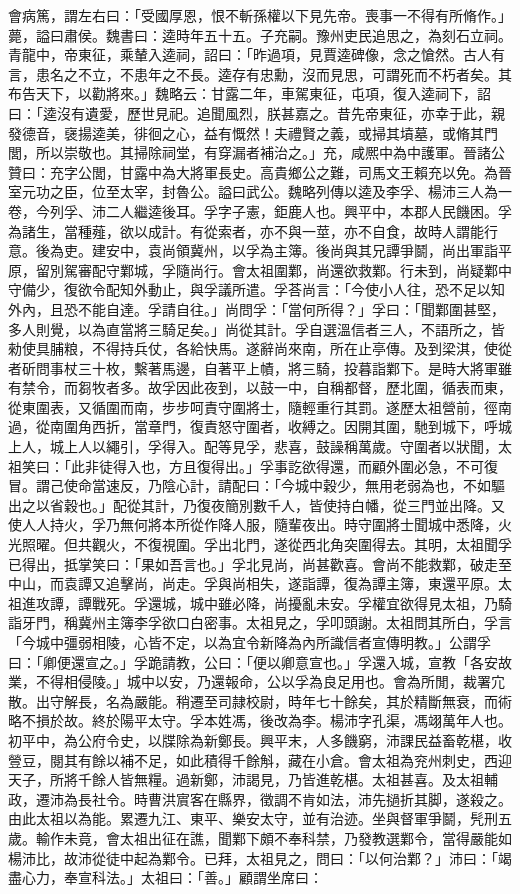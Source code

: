 \begin{pinyinscope}
會病篤，謂左右曰：「受國厚恩，恨不斬孫權以下見先帝。喪事一不得有所脩作。」薨，謚曰肅侯。魏書曰：逵時年五十五。子充嗣。豫州吏民追思之，為刻石立祠。青龍中，帝東征，乘輦入逵祠，詔曰：「昨過項，見賈逵碑像，念之愴然。古人有言，患名之不立，不患年之不長。逵存有忠勳，沒而見思，可謂死而不朽者矣。其布告天下，以勸將來。」魏略云：甘露二年，車駕東征，屯項，復入逵祠下，詔曰：「逵沒有遺愛，歷世見祀。追聞風烈，朕甚嘉之。昔先帝東征，亦幸于此，親發德音，襃揚逵美，徘徊之心，益有慨然！夫禮賢之義，或掃其墳墓，或脩其門閭，所以崇敬也。其掃除祠堂，有穿漏者補治之。」充，咸熈中為中護軍。晉諸公贊曰：充字公閭，甘露中為大將軍長史。高貴鄉公之難，司馬文王賴充以免。為晉室元功之臣，位至太宰，封魯公。謚曰武公。魏略列傳以逵及李孚、楊沛三人為一卷，今列孚、沛二人繼逵後耳。孚字子憲，鉅鹿人也。興平中，本郡人民饑困。孚為諸生，當種薤，欲以成計。有從索者，亦不與一莖，亦不自食，故時人謂能行意。後為吏。建安中，袁尚領冀州，以孚為主簿。後尚與其兄譚爭鬬，尚出軍詣平原，留別駕審配守鄴城，孚隨尚行。會太祖圍鄴，尚還欲救鄴。行未到，尚疑鄴中守備少，復欲令配知外動止，與孚議所遣。孚荅尚言：「今使小人往，恐不足以知外內，且恐不能自達。孚請自往。」尚問孚：「當何所得？」孚曰：「聞鄴圍甚堅，多人則覺，以為直當將三騎足矣。」尚從其計。孚自選溫信者三人，不語所之，皆勑使具脯粮，不得持兵仗，各給快馬。遂辭尚來南，所在止亭傳。及到梁淇，使從者斫問事杖三十枚，繫著馬邊，自著平上幘，將三騎，投暮詣鄴下。是時大將軍雖有禁令，而芻牧者多。故孚因此夜到，以鼓一中，自稱都督，歷北圍，循表而東，從東圍表，又循圍而南，步步呵責守圍將士，隨輕重行其罰。遂歷太祖營前，徑南過，從南圍角西折，當章門，復責怒守圍者，收縛之。因開其圍，馳到城下，呼城上人，城上人以繩引，孚得入。配等見孚，悲喜，鼓譟稱萬歲。守圍者以狀聞，太祖笑曰：「此非徒得入也，方且復得出。」孚事訖欲得還，而顧外圍必急，不可復冒。謂己使命當速反，乃陰心計，請配曰：「今城中穀少，無用老弱為也，不如驅出之以省穀也。」配從其計，乃復夜簡別數千人，皆使持白幡，從三門並出降。又使人人持火，孚乃無何將本所從作降人服，隨輩夜出。時守圍將士聞城中悉降，火光照曜。但共觀火，不復視圍。孚出北門，遂從西北角突圍得去。其明，太祖聞孚已得出，抵掌笑曰：「果如吾言也。」孚北見尚，尚甚歡喜。會尚不能救鄴，破走至中山，而袁譚又追擊尚，尚走。孚與尚相失，遂詣譚，復為譚主簿，東還平原。太祖進攻譚，譚戰死。孚還城，城中雖必降，尚擾亂未安。孚權宜欲得見太祖，乃騎詣牙門，稱冀州主簿李孚欲口白密事。太祖見之，孚叩頭謝。太祖問其所白，孚言「今城中彊弱相陵，心皆不定，以為宜令新降為內所識信者宣傳明教。」公謂孚曰：「卿便還宣之。」孚跪請教，公曰：「便以卿意宣也。」孚還入城，宣教「各安故業，不得相侵陵。」城中以安，乃還報命，公以孚為良足用也。會為所閒，裁署宂散。出守解長，名為嚴能。稍遷至司隷校尉，時年七十餘矣，其於精斷無衰，而術略不損於故。終於陽平太守。孚本姓馮，後改為李。楊沛字孔渠，馮翊萬年人也。初平中，為公府令史，以牒除為新鄭長。興平末，人多饑窮，沛課民益畜乾椹，收䝁豆，閱其有餘以補不足，如此積得千餘斛，藏在小倉。會太祖為兖州刺史，西迎天子，所將千餘人皆無糧。過新鄭，沛謁見，乃皆進乾椹。太祖甚喜。及太祖輔政，遷沛為長社令。時曹洪賔客在縣界，徵調不肯如法，沛先撾折其脚，遂殺之。由此太祖以為能。累遷九江、東平、樂安太守，並有治迹。坐與督軍爭鬬，髠刑五歲。輸作未竟，會太祖出征在譙，聞鄴下頗不奉科禁，乃發教選鄴令，當得嚴能如楊沛比，故沛從徒中起為鄴令。已拜，太祖見之，問曰：「以何治鄴？」沛曰：「竭盡心力，奉宣科法。」太祖曰：「善。」顧謂坐席曰：
\end{pinyinscope}
